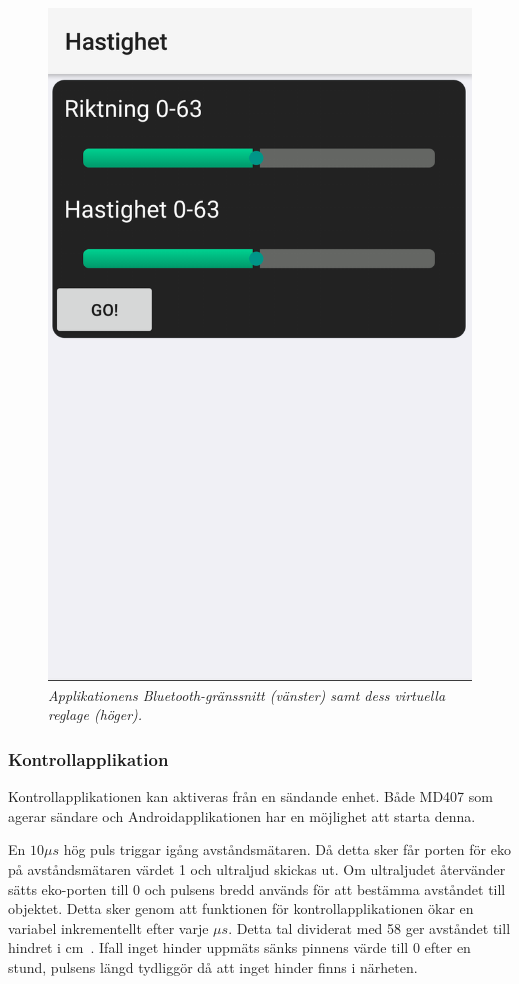 \documentclass[a4paper]{article}
\begin{document}
\begin{figure}[H]
\includegraphics[scale=0.2]{Mobilapp2.png}
\centering
\caption{\it Applikationens Bluetooth-gränssnitt (vänster) samt dess virtuella reglage (höger).}
\end{figure} 

\subsubsection{Kontrollapplikation}
Kontrollapplikationen kan aktiveras från en sändande enhet. Både MD407 som agerar sändare och Androidapplikationen har en möjlighet att starta denna. %


\vspace{5mm} \noindent
En $10\mu s$ hög puls triggar igång avståndsmätaren. Då detta sker får porten för eko på avståndsmätaren värdet 1 och ultraljud skickas ut. Om ultraljudet återvänder sätts eko-porten till 0 och pulsens bredd används för att bestämma avståndet till objektet. Detta sker genom att funktionen för kontrollapplikationen ökar en variabel inkrementellt efter varje $\mu s$. Detta tal dividerat med 58 ger avståndet till hindret i cm~\cite{DistMeasure}. Ifall inget hinder uppmäts sänks pinnens värde till 0 efter en stund, pulsens längd tydliggör då att inget hinder finns i närheten.
\end{document}
